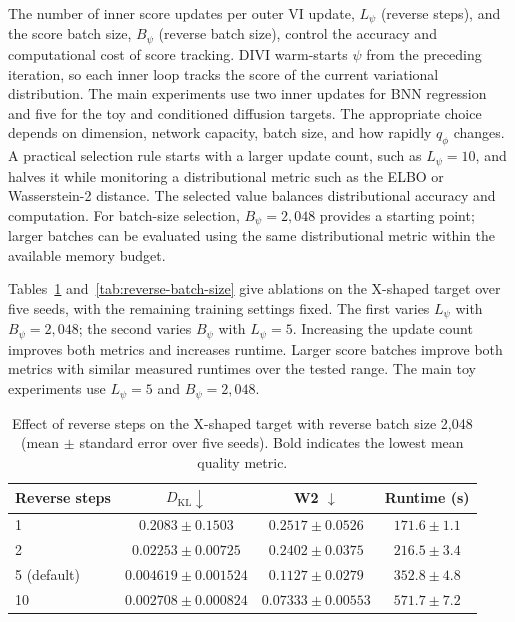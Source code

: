 The number of inner score updates per outer VI update, $L_\psi$ (reverse steps), and the score batch size, $B_\psi$ (reverse batch size), control the accuracy and computational cost of score tracking. DIVI warm-starts $\psi$ from the preceding iteration, so each inner loop tracks the score of the current variational distribution. The main experiments use two inner updates for BNN regression and five for the toy and conditioned diffusion targets. The appropriate choice depends on dimension, network capacity, batch size, and how rapidly $q_\phi$ changes. A practical selection rule starts with a larger update count, such as $L_\psi=10$, and halves it while monitoring a distributional metric such as the ELBO or Wasserstein-2 distance. The selected value balances distributional accuracy and computation. For batch-size selection, $B_\psi=2{,}048$ provides a starting point; larger batches can be evaluated using the same distributional metric within the available memory budget.

Tables~\ref{tab:reverse-steps} and~\ref{tab:reverse-batch-size} give ablations on the X-shaped target over five seeds, with the remaining training settings fixed. The first varies $L_\psi$ with $B_\psi=2{,}048$; the second varies $B_\psi$ with $L_\psi=5$. Increasing the update count improves both metrics and increases runtime. Larger score batches improve both metrics with similar measured runtimes over the tested range. The main toy experiments use $L_\psi=5$ and $B_\psi=2{,}048$.

\begin{table}[!htbp]
\centering
\caption{Effect of reverse steps on the X-shaped target with reverse batch size 2,048 (mean $\pm$ standard error over five seeds). Bold indicates the lowest mean quality metric.}
\label{tab:reverse-steps}
\small
\begin{tabular}{lccc}
\toprule
Reverse steps & $D_{\mathrm{KL}}\downarrow$ & W2 $\downarrow$ & Runtime (s) \\
\midrule
1 & $0.2083\pm0.1503$ & $0.2517\pm0.0526$ & $171.6\pm1.1$ \\
2 & $0.02253\pm0.00725$ & $0.2402\pm0.0375$ & $216.5\pm3.4$ \\
5 (default) & $0.004619\pm0.001524$ & $0.1127\pm0.0279$ & $352.8\pm4.8$ \\
10 & $\mathbf{0.002708\pm0.000824}$ & $\mathbf{0.07333\pm0.00553}$ & $571.7\pm7.2$ \\
\bottomrule
\end{tabular}
\end{table}

